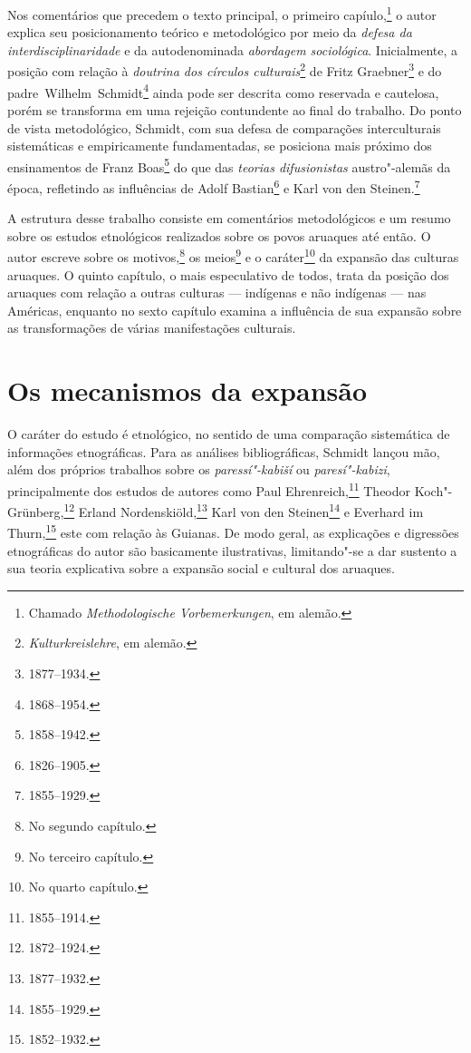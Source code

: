 Nos comentários que precedem o texto principal, o primeiro capíulo,\footnote{Chamado \textit{Methodologische Vorbemerkungen}, em alemão.} o autor explica seu posicionamento teórico e metodológico por meio da \emph{defesa da interdisciplinaridade} e da autodenominada \emph{abordagem sociológica}. Inicialmente, a posição com relação à \textit{doutrina dos círculos culturais}\footnote{\textit{Kulturkreislehre}, em alemão.} de Fritz Graebner\footnote{1877--1934.} e do padre~Wilhelm~Schmidt\footnote{1868--1954.} ainda pode ser descrita como reservada e cautelosa, porém se transforma em uma rejeição contundente ao final do trabalho. Do ponto de vista metodológico, Schmidt, com sua defesa de comparações interculturais sistemáticas e empiricamente fundamentadas, se posiciona mais próximo dos ensinamentos de Franz Boas\footnote{1858--1942.} do que das \textit{teorias difusionistas} austro"-alemãs da época, refletindo as influências de Adolf Bastian\footnote{1826--1905.} e Karl von den Steinen.\footnote{1855--1929.}

A estrutura desse trabalho consiste em comentários metodológicos e um resumo sobre os estudos etnológicos realizados sobre os povos aruaques até então. O autor escreve sobre os motivos,\footnote{No segundo capítulo.} os meios\footnote{No terceiro capítulo.} e o caráter\footnote{No quarto capítulo.} da expansão das culturas aruaques. O quinto capítulo, o mais especulativo de todos, trata da posição dos aruaques com relação a outras culturas --- indígenas e não indígenas --- nas Américas, enquanto no sexto capítulo examina a influência de sua expansão sobre as transformações de várias manifestações culturais. 

\section{Os mecanismos da expansão}

O caráter do estudo é etnológico, no sentido de uma comparação sistemática de informações etnográficas. Para as análises bibliográficas, Schmidt lançou mão, além dos próprios trabalhos sobre os \textit{paressí"-kabiší} ou \textit{paresí"-kabizi}, principalmente dos estudos de autores como Paul Ehrenreich,\footnote{1855--1914.} Theodor Koch"-Grünberg,\footnote{1872--1924.} Erland Nordenskiöld,\footnote{1877--1932.} Karl von den Steinen\footnote{1855--1929.} e Everhard im Thurn,\footnote{1852--1932.} este com relação às Guianas. De modo geral, as explicações e digressões etnográficas do autor são basicamente ilustrativas, limitando"-se a dar sustento a sua teoria explicativa sobre a expansão social e cultural dos aruaques.

